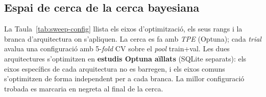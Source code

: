 \documentclass[10pt,a4paper,twocolumn,twoside]{article}
\begin{document}
\newpage

\subsection{Espai de cerca de la cerca bayesiana}
\label{app:sweep-config}

La Taula~\ref{tab:sweep-config} llista els eixos d'optimització, els seus rangs i la branca
d'arquitectura on s'apliquen. La cerca es fa amb \textit{TPE} (Optuna); cada \textit{trial} avalua
una configuració amb 5-\textit{fold} CV sobre el \textit{pool} train+val. Les dues arquitectures
s'optimitzen en \textbf{estudis Optuna aïllats} (SQLite separats): els eixos específics de cada
arquitectura no es barregen, i els eixos comuns s'optimitzen de forma independent per a cada branca.
La millor configuració trobada es marcaria en negreta al final de la cerca.
\end{document}
